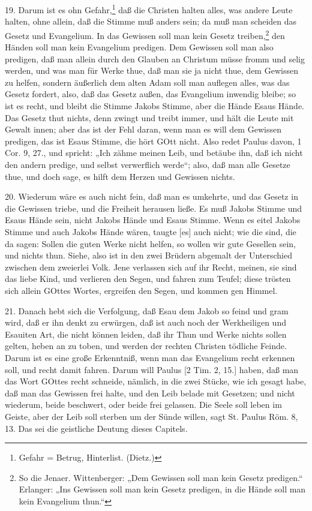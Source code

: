 19. Darum ist es ohn Gefahr,\footnote{Gefahr = Betrug, Hinterlist. (Dietz.)} daß die Christen halten alles, was andere Leute halten,
ohne allein, daß die Stimme muß anders sein; da muß man scheiden das Gesetz und Evangelium. In das Gewissen soll man kein Gesetz treiben,\footnote{So die Jenaer. Wittenberger: „Dem Gewissen soll man kein Gesetz predigen.“ Erlanger: „Ins Gewissen soll man kein Gesetz predigen, in die Hände soll man kein Evangelium thun.“} den Händen soll man kein Evangelium predigen. Dem Gewissen soll man also predigen, daß man allein durch den Glauben an Christum müsse fromm und selig werden, und was man für Werke thue, daß man sie ja nicht thue, dem Gewissen zu helfen, sondern äußerlich dem alten Adam soll man auflegen alles, was das Gesetz fordert, also, daß das Gesetz außen, das Evangelium inwendig bleibe; so ist es recht, und bleibt die Stimme Jakobs Stimme, aber die Hände Esaus Hände. Das Gesetz thut nichts, denn zwingt und treibt immer, und hält die Leute mit Gewalt innen; aber das ist der Fehl daran, wenn man es will dem Gewissen predigen, das ist Esaus Stimme, die hört GOtt nicht. Also redet Paulus davon, 1 Cor. 9, 27., und spricht: „Ich zähme meinen Leib, und betäube ihn, daß ich nicht den andern predige, und selbst verwerflich werde“; also, daß man alle Gesetze thue, und doch sage, es hilft dem Herzen und Gewissen nichts.

20. Wiederum wäre es auch nicht fein, daß man es umkehrte, und das Gesetz in die Gewissen triebe, und die Freiheit herausen ließe. Es muß Jakobs Stimme und Esaus Hände sein, nicht Jakobs Hände und Esaus Stimme. Wenn es eitel Jakobs Stimme und auch Jakobs Hände wären, taugte [es] auch nicht; wie die sind, die da sagen: Sollen die guten Werke nicht helfen, so wollen wir gute Gesellen sein, und nichts thun. Siehe, also ist in den zwei Brüdern abgemalt der Unterschied zwischen dem zweierlei Volk. Jene verlassen sich auf ihr Recht, meinen, sie sind das liebe Kind, und verlieren den Segen, und fahren zum Teufel; diese trösten sich allein GOttes Wortes, ergreifen den Segen, und kommen gen Himmel.

21. Danach hebt sich die Verfolgung, daß Esau dem Jakob so feind und gram wird, daß er ihn denkt zu erwürgen, daß ist auch noch der Werkheiligen und Esauiten Art, die nicht können leiden, daß ihr Thun und Werke nichts sollen gelten, heben an zu toben, und werden der rechten Christen tödliche Feinde. Darum ist es eine große Erkenntniß, wenn man das Evangelium recht erkennen soll, und recht damit fahren. Darum will Paulus [2 Tim. 2, 15.] haben, daß man das Wort GOttes recht schneide, nämlich, in die zwei Stücke, wie ich gesagt habe, daß man das Gewissen frei halte, und den Leib belade mit Gesetzen; und nicht wiederum, beide beschwert, oder beide frei gelassen. Die Seele soll leben im Geiste, aber der Leib soll sterben um der Sünde willen, sagt St. Paulus Röm. 8, 13. Das sei die geistliche Deutung dieses Capitels.

